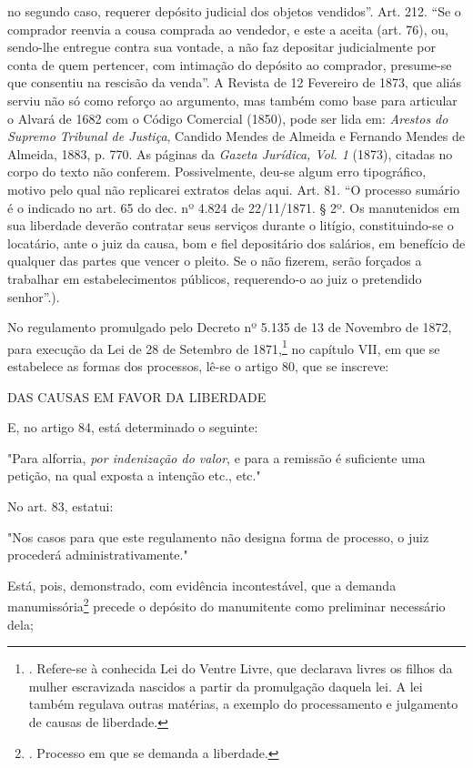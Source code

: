 {  no segundo caso, requerer depósito judicial dos objetos vendidos''.
  Art. 212. ``Se o comprador reenvia a cousa comprada ao vendedor, e
  este a aceita (art. 76), ou, sendo-lhe entregue contra sua vontade, a
  não faz depositar judicialmente por conta de quem pertencer, com
  intimação do depósito ao comprador, presume-se que consentiu na
  rescisão da venda''. A Revista de 12 Fevereiro de 1873, que aliás
  serviu não só como reforço ao argumento, mas também como base para
  articular o Alvará de 1682 com o Código Comercial (1850), pode ser
  lida em: \emph{Arestos do Supremo Tribunal de Justiça}, Candido Mendes
  de Almeida e Fernando Mendes de Almeida, 1883, p. 770. As páginas da
  \emph{Gazeta Jurídica, Vol. 1} (1873), citadas no corpo do texto não
  conferem. Possivelmente, deu-se algum erro tipográfico, motivo pelo
  qual não replicarei extratos delas aqui. Art. 81. ``O processo sumário
  é o indicado no art. 65 do dec. nº 4.824 de 22/11/1871. § 2º. Os
  manutenidos em sua liberdade deverão contratar seus serviços durante o
  litígio, constituindo-se o locatário, ante o juiz da causa, bom e fiel
  depositário dos salários, em benefício de qualquer das partes que
  vencer o pleito. Se o não fizerem, serão forçados a trabalhar em
  estabelecimentos públicos, requerendo-o ao juiz o pretendido senhor''.}).

No regulamento promulgado pelo Decreto nº 5.135 de 13 de Novembro de
1872, para execução da Lei de 28 de Setembro de 1871,\footnote{.
  Refere-se à conhecida Lei do Ventre Livre, que declarava livres os
  filhos da mulher escravizada nascidos a partir da promulgação daquela
  lei. A lei também regulava outras matérias, a exemplo do processamento
  e julgamento de causas de liberdade.} no capítulo VII, em que se
estabelece as formas dos processos, lê-se o artigo 80, que se inscreve:

DAS CAUSAS EM FAVOR DA LIBERDADE

E, no artigo 84, está determinado o seguinte:

"Para alforria, \emph{por indenização do valor}, e para a remissão é
suficiente uma petição, na qual exposta a intenção etc., etc."

No art. 83, estatui:

"Nos casos para que este regulamento não designa forma de processo, o
juiz procederá administrativamente."

Está, pois, demonstrado, com evidência incontestável, que a demanda
manumissória\footnote{. Processo em que se demanda a liberdade.} precede
o depósito do manumitente como preliminar necessário dela;

